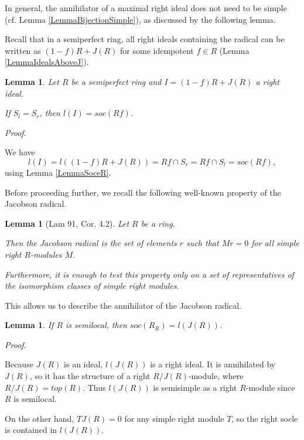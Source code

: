 \documentclass[11pt]{article}
\theoremstyle{plain}
\newtheorem{Lemma}[veta]{Lemma}
\theoremstyle{remark}
\theoremstyle{plain}
\newenvironment{Proof}{
  \par\medskip\noindent
  \textit{Proof}.
}{
\newline
\rightline{$\qedsymbol$}
}
\begin{document}
    In general, the annihilator of a maximal right ideal does not need to be simple (cf. Lemma \ref{LemmaBijectionSimple}), as discussed by the following lemma. 
    
    Recall that in a semiperfect ring, all right ideals containing the radical can be written as $(1-f)R+J(R)$ for some idempotent $f\in R$ (Lemma \ref{LemmaIdealsAboveJ}).

     \begin{Lemma}\label{LemmaAnnMax}
    Let $R$ be a semiperfect ring and $I=(1-f)R+J(R)$ a right ideal.

    If $S_l=S_r$, then $l(I)=soc(Rf)$.
\end{Lemma}
\begin{Proof}
We have \[l(I)=l((1-f)R+J(R))=Rf\cap S_r=Rf\cap S_l=soc(Rf),\]
using Lemma \ref{LemmaSoceR}.
\end{Proof}

Before proceeding further, we recall the following well-known property of the Jacobson radical.
\begin{Lemma}[Lam 91, Cor. 4.2]\label{LemmaJdef}
    Let $R$ be a ring.

    Then the Jacobson radical is the set of elements $r$ such that $Mr=0$ for all simple right $R$-modules $M$.
    
        Furthermore, it is enough to test this property only on a set of representatives of the isomorphism classes of simple right modules.
\end{Lemma}

This allows us to describe the annihilator of the Jacobson radical.
\begin{Lemma}\label{Lemmal(J(R))}
    If $R$ is semilocal, then  $soc(R_R)=l(J(R))$.
\end{Lemma}
\begin{Proof}
Because $J(R)$ is an ideal, $l(J(R))$ is a right ideal. It is annihilated by $J(R)$, so it has the structure of a right $R/J(R)$-module, where $R/J(R)=top(R)$. Thus $l(J(R))$ is semisimple as a right $R$-module since $R$ is semilocal.

On the other hand,  $TJ(R)=0$ for any simple right module $T$, so the right socle is contained in $l(J(R))$.   
\end{Proof}
   
\end{document}
